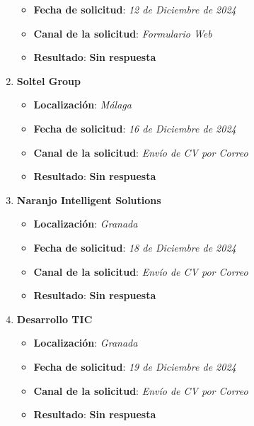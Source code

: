 \begin{enumerate}
\begin{itemize}
		\item \textbf{Fecha de solicitud}: \textit{12 de Diciembre de 2024}
		\item \textbf{Canal de la solicitud}: \textit{Formulario Web}
		\item \textbf{Resultado}: {\color{orange} \textbf{Sin respuesta}}
	\end{itemize}
	 \item \textbf{Soltel Group}
	\begin{itemize}
		\item \textbf{Localización}: \textit{Málaga}
		\item \textbf{Fecha de solicitud}: \textit{16 de Diciembre de 2024}
		\item \textbf{Canal de la solicitud}: \textit{Envío de CV por Correo}
		\item \textbf{Resultado}: {\color{orange} \textbf{Sin respuesta}}
	\end{itemize}
    \item \textbf{Naranjo Intelligent Solutions}
	\begin{itemize}
		\item \textbf{Localización}: \textit{Granada}
		\item \textbf{Fecha de solicitud}: \textit{18 de Diciembre de 2024}
		\item \textbf{Canal de la solicitud}: \textit{Envío de CV por Correo}
		\item \textbf{Resultado}: {\color{orange} \textbf{Sin respuesta}}
	\end{itemize}
	\item \textbf{Desarrollo TIC}
	\begin{itemize}
		\item \textbf{Localización}: \textit{Granada}
		\item \textbf{Fecha de solicitud}: \textit{19 de Diciembre de 2024}
		\item \textbf{Canal de la solicitud}: \textit{Envío de CV por Correo}
		\item \textbf{Resultado}: {\color{orange} \textbf{Sin respuesta}}
	\end{itemize}
\end{enumerate}







%

